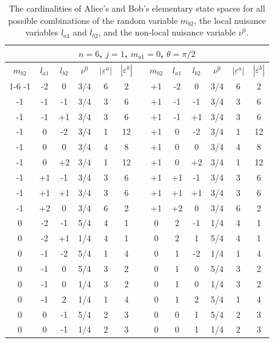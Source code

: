 \documentclass{article}
\begin{document}
\begin{table}[h]
\begin{centering}
\begin{tabular}{|c|c|c|c|c|c|c|c|c|c|c|c|c|}
\hline 
\multicolumn{13}{|c|}{$n=6$, $j=1$, $m_{a1}=0$, $\theta=\pi/2$}\tabularnewline
\hline 
$m_{b2}$ & $l_{a1}$ & $l_{b2}$ & $\nu^{0}$ & $|\varepsilon^{a}|$ & $|\varepsilon^{b}|$ &  & $m_{b2}$ & $l_{a1}$ & $l_{b2}$ & $\nu^{0}$ & $|\varepsilon^{a}|$ & $|\varepsilon^{b}|$\tabularnewline
\cline{1-6} \cline{8-13} 
-1 & -2 & 0 & 3/4 & 6 & 2 &  & +1 & -2 & 0 & 3/4 & 6 & 2\tabularnewline
-1 & -1 & -1 & 3/4 & 3 & 6 &  & +1 & -1 & -1 & 3/4 & 3 & 6\tabularnewline
-1 & -1 & +1 & 3/4 & 3 & 6 &  & +1 & -1 & +1 & 3/4 & 3 & 6\tabularnewline
-1 & 0 & -2 & 3/4 & 1 & 12 &  & +1 & 0 & -2 & 3/4 & 1 & 12\tabularnewline
-1 & 0 & 0 & 3/4 & 4 & 8 &  & +1 & 0 & 0 & 3/4 & 4 & 8\tabularnewline
-1 & 0 & +2 & 3/4 & 1 & 12 &  & +1 & 0 & +2 & 3/4 & 1 & 12\tabularnewline
-1 & +1 & -1 & 3/4 & 3 & 6 &  & +1 & +1 & -1 & 3/4 & 3 & 6\tabularnewline
-1 & +1 & +1 & 3/4 & 3 & 6 &  & +1 & +1 & +1 & 3/4 & 3 & 6\tabularnewline
-1 & +2 & 0 & 3/4 & 6 & 2 &  & +1 & +2 & 0 & 3/4 & 6 & 2\tabularnewline
0 & -2 & -1 & 5/4 & 4 & 1 &  & 0 & 2 & -1 & 1/4 & 4 & 1\tabularnewline
0 & -2 & +1 & 1/4 & 4 & 1 &  & 0 & 2 & 1 & 5/4 & 4 & 1\tabularnewline
0 & -1 & -2 & 5/4 & 1 & 4 &  & 0 & 1 & -2 & 1/4 & 1 & 4\tabularnewline
0 & -1 & 0 & 5/4 & 3 & 2 &  & 0 & 1 & 0 & 5/4 & 3 & 2\tabularnewline
0 & -1 & 0 & 1/4 & 3 & 2 &  & 0 & 1 & 0 & 1/4 & 3 & 2\tabularnewline
0 & -1 & 2 & 1/4 & 1 & 4 &  & 0 & 1 & 2 & 5/4 & 1 & 4\tabularnewline
0 & 0 & -1 & 5/4 & 2 & 3 &  & 0 & 0 & 1 & 5/4 & 2 & 3\tabularnewline
0 & 0 & -1 & 1/4 & 2 & 3 &  & 0 & 0 & 1 & 1/4 & 2 & 3\tabularnewline
\hline 
\end{tabular}
\par\end{centering}
\caption{The cardinalities of Alice's and Bob's elementary state spaces for all possible combinations of the random variable $m_{b2}$, the local nuisance variables $l_{a1}$ and $l_{b2}$, and the non-local nuisance variable $\nu^0$.}
\label{tab: sample epsilons 1}
\end{table}
\end{document}
